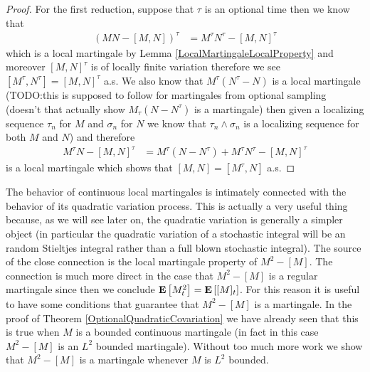 \begin{proof}
For the first reduction, suppose that $\tau$ is an optional time then we know that
\begin{align*}
(MN - [M,N])^\tau &= M^\tau N^\tau - [M,N]^\tau
\end{align*}
which is a local martingale by Lemma \ref{LocalMartingaleLocalProperty} and moreover $[M,N]^\tau$ is of locally finite variation therefore we see $[M^\tau,N^\tau] = [M,N]^\tau$ a.s.  We also know that $M^\tau (N^\tau -N)$ is a local martingale (TODO:this is supposed to follow for martingales from optional sampling (doesn't that actually show $M_\tau(N - N^\tau)$ is a martingale) then given a localizing sequence $\tau_n$ for $M$ and $\sigma_n$ for $N$ we know that $\tau_n \wedge \sigma_n$ is a localizing sequence for both $M$ and $N$) and therefore 
\begin{align*}
M^\tau N - [M,N]^\tau &= M^\tau (N - N^\tau)  + M^\tau N^\tau - [M,N]^\tau
\end{align*}
is a local martingale which shows that $[M,N]= [M^\tau,N]$ a.s.
\end{proof}

The behavior of continuous local martingales is intimately connected with the behavior of its quadratic variation process.  This is actually a very useful thing because, as we will see later on, the quadratic variation is generally a simpler object (in particular the quadratic variation of a stochastic integral will be an random Stieltjes integral rather than a full blown stochastic integral).  The source of the close connection is the local martingale property of $M^2 - [M]$.  The connection is much more direct in the case that $M^2 - [M]$ is a regular martingale since then we conclude $\textbf{E}\left[M^2_t\right] = \textbf{E}\left[[M]_t\right]$.  For this reason it is useful to have some conditions that guarantee that $M^2 - [M]$ is a martingale. In the proof of Theorem \ref{OptionalQuadraticCovariation} we have already seen that this is true when $M$ is a bounded continuous martingale (in fact in this case $M^2 - [M]$ is an $L^2$ bounded martingale).  Without too much more work we show that $M^2-[M]$ is a martingale whenever $M$ is $L^2$ bounded. 

